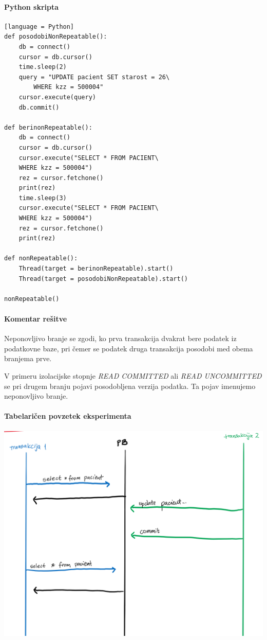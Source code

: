 \documentclass[a4paper,11pt]{report}
\begin{document}
\paragraph{Python skripta}\mbox{}

\begin{lstlisting}[showstringspaces=false][language = Python]
def posodobiNonRepeatable():
    db = connect()
    cursor = db.cursor()
    time.sleep(2)
    query = "UPDATE pacient SET starost = 26\
        WHERE kzz = 500004"
    cursor.execute(query)
    db.commit()

def berinonRepeatable():
    db = connect()
    cursor = db.cursor()
    cursor.execute("SELECT * FROM PACIENT\
    WHERE kzz = 500004")
    rez = cursor.fetchone()
    print(rez)
    time.sleep(3)
    cursor.execute("SELECT * FROM PACIENT\ 
    WHERE kzz = 500004")
    rez = cursor.fetchone()
    print(rez)

def nonRepeatable():
    Thread(target = berinonRepeatable).start()
    Thread(target = posodobiNonRepeatable).start()

nonRepeatable()
\end{lstlisting}

\paragraph{Komentar rešitve}
Neponovljivo branje se zgodi, ko prva transakcija dvakrat bere podatek iz podatkovne baze, pri čemer se
podatek druga transakcija posodobi med obema branjema prve.

V primeru izolacijske stopnje \textit{READ COMMITTED} ali \textit{READ UNCOMMITTED} se pri drugem branju pojavi posodobljena verzija
podatka. Ta pojav imenujemo neponovljivo branje.
\pagebreak
\paragraph{Tabelaričen povzetek eksperimenta}\mbox{}

\noindent\includegraphics[width=\linewidth]{./pics/nonrepeatable.png}
\end{document}
